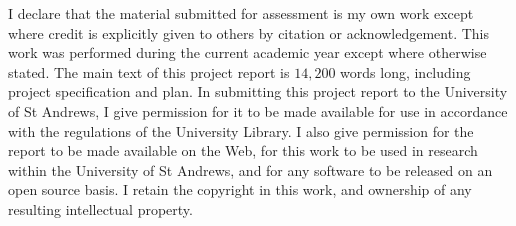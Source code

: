 I declare that the material submitted for assessment is my own work except where credit is explicitly given to others by citation or acknowledgement. This work was performed during the current academic year except where otherwise stated. The main text of this project report is $14,200$ words long, including project specification and plan. In submitting this project report to the University of St Andrews, I give permission for it to be made available for use in accordance with the regulations of the University Library. I also give permission for the report to be made available on the Web, for this work to be used in research within the University of St Andrews, and for any software to be released on an open source basis. I retain the copyright in this work, and ownership of any resulting intellectual property.
